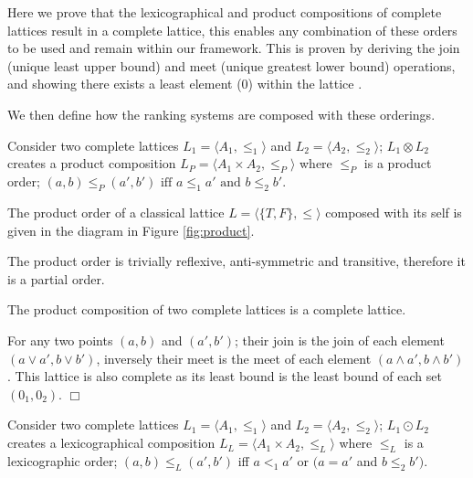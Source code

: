 Here we prove that the lexicographical and product compositions of complete lattices result in a complete lattice,
this enables any combination of these orders to be used and remain within our framework.
This is proven by deriving the join (unique least upper bound) and meet (unique greatest lower bound) operations,
and showing there exists a least element ($0$) within the lattice \cite{davey1990introduction}. 

We then define how the ranking systems are composed with these orderings.

\begin{defs}
\label{def:product_order}
Consider two complete lattices $L_1 = \langle A_1, \leq_1 \rangle$ and $L_2 = \langle A_2, \leq_2 \rangle$;
$L_1 \otimes L_2$ creates a product composition $L_P = \langle A_1 \times A_2, \leq_P \rangle$
where $\leq_P$ is a product order; 
$(a,b) \leq_{P} (a',b') \mbox{ iff } a \leq_{1} a' \mbox{ and } b \leq_{2} b'$.
\end{defs}

The product order of a classical lattice $L = \langle \{T,F\}, \leq \rangle$ 
composed with its self is given in the diagram in Figure \ref{fig:product}.

The product order is trivially reflexive, anti-symmetric and transitive, therefore it is a partial order.
\begin{prop}
The product composition of two complete lattices is a complete lattice.  
\end{prop}
\begin{prof}
For any two points $(a,b)$ and $(a',b')$;
their join is the join of each element $(a \vee a', b \vee b')$, 
inversely their meet is the meet of each element $(a \wedge a', b \wedge b')$.
This lattice is also complete as its least bound is the least bound of each set $(0_1,0_2)$.
$\Box$\end{prof}

\begin{defs}
\label{def:lex_order}
Consider two complete lattices $L_1 = \langle A_1, \leq_1 \rangle$ and $L_2 = \langle A_2, \leq_2 \rangle$;
$L_1 \odot L_2$ creates a lexicographical composition  $L_L = \langle A_1 \times A_2, \leq_L \rangle$
where $\leq_L$ is a lexicographic order;
$(a,b) \leq_{L} (a',b')$ iff $a <_{1} a'$ or $(a = a'$ and $b \leq_{2} b')$.
\end{defs}

